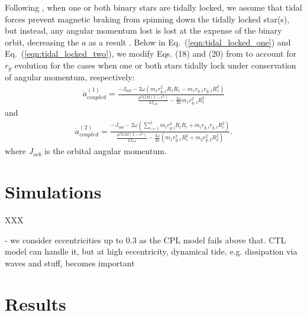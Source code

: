 \documentclass[twocolumn]{aastex61}
\begin{document}
Following \citet{Fleming2018}, when one or both binary stars are tidally locked, we assume that tidal forces prevent magnetic braking from spinning down the tidally locked star(s), but instead, any angular momentum lost is lost at the expense of the binary orbit, decreasing the $a$ as a result \citep{Verbunt1981}.  Below in Eq.~(\ref{eqn:tidal_locked_one}) and Eq.~(\ref{eqn:tidal_locked_two}), we modify Eqs. (18) and (20) from \citet{Fleming2018} to account for $r_g$ evolution for the cases when one or both stars tidally lock under conservation of angular momentum, respectively:
\small
\begin{equation} \label{eqn:tidal_locked_one}
\begin{split}
\dot{a}_{coupled}^{(1)} = \frac{-\dot{J}_{mb} - 2 \omega \left( m_1 r_{g,1}^2 R_1 \dot{R_1} - m_1 r_{g,1} \dot{r}_{g,1} R_1^2 \right)}
{\frac{\mu^2 G M (1-e^2)}{2J_{orb}} - \frac{3 \omega}{2a} m_1 r_{g,1}^2 R_1^2}
\end{split}
\end{equation}
\normalsize
and
\small
\begin{equation} \label{eqn:tidal_locked_two}
\begin{split}
\dot{a}_{coupled}^{(2)} = \frac{-\dot{J}_{mb} - 2 \omega \left( \sum_{i=1}^{2} m_i r_{g,i}^2 R_i \dot{R_i} + m_i r_{g,i} \dot{r}_{g,i} R_i^2 \right)}
{\frac{\mu^2 G M (1-e^2)}{2J_{orb}} - \frac{3 \omega}{2a} \left( m_1 r_{g,1}^2 R_1^2 + m_2 r_{g,2}^2 R_2^2 \right)}.
\end{split}
\end{equation}
\normalsize
where $J_{orb}$ is the orbital angular momentum.


\section{Simulations} \label{sec:simulations}

XXX

- we consider eccentricities up to 0.3 as the CPL model fails above that.  CTL model can handle it, but at high eccentricity, dynamical tide, e.g. dissipation via waves and stuff, becomes important


\section{Results} \label{sec:results}
\end{document}
